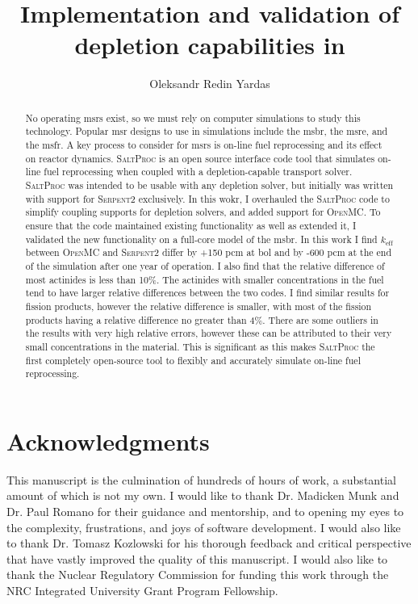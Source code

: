 \documentclass[edeposit,fullpage,hidelinks]{uiucthesis2018}
\title{Implementation and validation of \OpenMC depletion capabilities in \SaltProc}
\author{Oleksandr Redin Yardas}
\newcommand{\SaltProc}{\textsc{SaltProc}\xspace}
\newcommand{\OpenMC}{\textsc{OpenMC}\xspace}
\newcommand{\SerpentTWO}{\textsc{Serpent2}\xspace}
\begin{document}

\maketitle

\frontmatter
\begin{abstract}
No operating \Gls{msr}s exist, so we must rely on computer simulations
to study this technology. Popular \Gls{msr} designs to use in simulations
include the \Gls{msbr}, the \Gls{msre}, and the \Gls{msfr}. A key process to
consider for \Gls{msr}s is on-line fuel reprocessing and its effect on reactor
dynamics. \SaltProc is an open source interface code tool that simulates on-line
fuel reprocessing when coupled with a depletion-capable transport solver.
\SaltProc was intended to be usable with any depletion solver, but initially was written
with support for \SerpentTWO exclusively. In this wokr, I overhauled the \SaltProc code
to simplify coupling supports for depletion solvers, and added support for \OpenMC.
To ensure that the code maintained existing functionality as well as extended it, I
validated the new functionality on a full-core model of the \Gls{msbr}. In this work I find
$k_\text{eff}$ between \OpenMC and \SerpentTWO differ by +150 pcm at \Gls{bol}
and by -600 pcm at the end of the simulation after one year of operation. I also find
that the relative difference of most actinides is less than 10\%. The actinides
with smaller concentrations in the fuel tend to have larger relative differences
between the two codes. I find similar results for fission products, however the 
relative difference is smaller, with most of the fission products having a
relative difference no greater than 4\%. There are some outliers in the results
with very high relative errors, however these can be attributed to their very small 
concentrations in the material. This is significant as this makes \SaltProc the first
completely open-source tool to flexibly and accurately simulate on-line fuel reprocessing.
\end{abstract}

\chapter*{Acknowledgments}

This manuscript is the culmination of hundreds of hours of work, a substantial
amount of which is not my own. I would like to thank Dr. Madicken Munk and Dr.
Paul Romano for their guidance and mentorship, and to opening my eyes to the
complexity, frustrations, and joys of software development. I would also like to
thank Dr. Tomasz Kozlowski for his thorough feedback and critical perspective
that have vastly improved the quality of this manuscript. I would also like to
thank the Nuclear Regulatory Commission for funding this work through the NRC
Integrated University Grant Program Fellowship.
\end{document}
